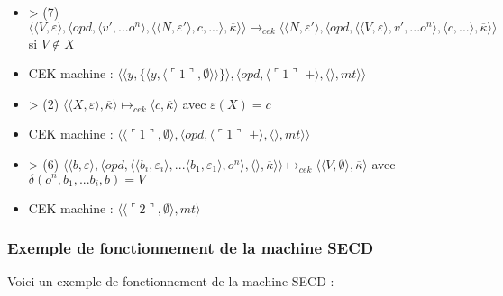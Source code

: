\documentclass[10pt,a4paper]{report}
\begin{document}
\begin{itemize}
\item[] > (7) $\langle \langle V,\varepsilon\rangle,\langle opd,\langle v',...o^{n}\rangle,\langle  \langle N,\varepsilon'\rangle,c,...\rangle,\overline{\kappa}\rangle\rangle \longmapsto_{cek} \langle \langle N,\varepsilon'\rangle,\langle opd,\langle  \langle V,\varepsilon\rangle,v',...o^{n}\rangle,\langle c,...\rangle,\overline{\kappa}\rangle\rangle$ si $V \notin X$
\item[] CEK machine : $\langle\langle y,\{\langle y,\langle\ulcorner 1\urcorner,\emptyset\rangle\rangle\}\rangle,\langle opd,\langle\ulcorner 1\urcorner$ $+\rangle,\langle\rangle,mt\rangle\rangle$
\item[] > (2) $\langle\langle X,\varepsilon\rangle,\overline{\kappa}\rangle \longmapsto_{cek} \langle c,\overline{\kappa}\rangle$ avec $\varepsilon(X) = c$
\item[] CEK machine : $\langle\langle\ulcorner 1\urcorner,\emptyset\rangle,\langle opd,\langle\ulcorner 1\urcorner$ $+\rangle,\langle\rangle,mt\rangle\rangle$
\item[] > (6) $\langle  \langle b,\varepsilon\rangle,\langle opd,\langle \langle b_{i},\varepsilon_{i}\rangle,...\langle b_{1},\varepsilon_{1}\rangle ,o^{n}\rangle,\langle\rangle,\overline{\kappa}\rangle\rangle \longmapsto_{cek} \langle \langle V,\emptyset\rangle,\overline{\kappa}\rangle$ avec $\delta(o^{n},b_{1},...b_{i},b) = V$
\item[] CEK machine : $\langle\langle\ulcorner 2\urcorner,\emptyset\rangle,mt\rangle$
\end{itemize}
\newpage



\subsubsection{Exemple de fonctionnement de la machine SECD}\label{SECD}

Voici un exemple de fonctionnement de la machine SECD :	
\end{document}
